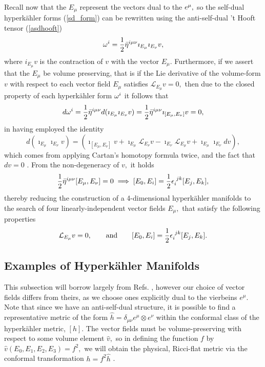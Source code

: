\documentclass[a4paper,12pt, onecolumn, notitlepage]{article}
\theoremstyle{definition}
\theoremstyle{remark}
\newcommand{\w}{\omega}
\newcommand{\m}{\mu}
\newcommand{\n}{\nu}
\newcommand{\e}{\epsilon}
\newcommand{\HK}{hyperk\"ahler }
\begin{document}
Recall now that the $E_{\m}$ represent the vectors dual to the $e\indices{^\m},$ so the self-dual \HK forms (\ref{sd_form}) can be rewritten using the anti-self-dual 't Hooft tensor (\ref{asdhooft}) \cite{ootsuka_1998}
\begin{equation*}
\w^{i} = \frac{1}{2}\bar{\eta}\indices{^i^\m^\n}\imath_{E_{\m}}\imath_{E_{\n}}v,
\end{equation*}
where $i_{E_{\m}}v$ is the contraction of $v$ with the vector $E_{\m}.$ Furthermore, if we assert that the $E_{\m}$ be volume preserving, that is if the Lie derivative of the volume-form $v$ with respect to each vector field $E_{\m}$ satisfies $\mathcal{L}_{E_{\m}}v = 0,$ then due to the closed property of each \HK form $\w\indices{^i}$ it follows that
\begin{align*}
	d\w^{i} = \frac{1}{2}\bar{\eta}\indices{^i^\m^\n}d(\imath_{E_{\m}}\imath_{E_{\n}}v) = \frac{1}{2}\bar{\eta}\indices{^i^\m^\n}\imath_{[E_{\m},E_{\n}]}v=0,
\end{align*}
in having employed the identity
\begin{equation*}
	\label{cartan}
	d(\imath_{E_{\m}}\imath_{E_{\n}}v)=(\imath_{[E_{\m},E_{\n}]}v + \imath_{E_{\m}}\mathcal{L}_{E_{\n}}v - \imath_{E_{\n}}\mathcal{L}_{E_{\m}}v + \imath_{E_{\m}}\imath_{E_{\n}}dv),
\end{equation*}
which comes from applying Cartan's homotopy formula twice, and the fact that $dv=0$ \cite{donaldson}. From the non-degeneracy of $v,$ it holds
\begin{equation}
	\label{half_flat}
	\frac{1}{2}\bar{\eta}\indices{^i^\m^\n}[E_{\m},E_{\n}] = 0 \implies [E_{0},E_{i}]=\frac{1}{2}\e\indices{_i^j^k}[E_{j},E_{k}],
\end{equation}
thereby reducing the construction of a 4-dimensional \HK manifolds to the search of four linearly-independent vector fields $E_{\m},$ that satisfy the following properties \cite{ootsuka_1998}
\begin{gather}
	\label{asj}
	\mathcal{L}_{E_{\m}}v = 0,\qquad \text{and}\qquad [E_{0},E_{i}]=\frac{1}{2}\e\indices{_i^j^k}[E_{j},E_{k}].
\end{gather}

\subsection{Examples of Hyperk\"ahler Manifolds}
This subsection will borrow largely from Refs. \cite{ootsuka_1998,joyce_1995}, however our choice of vector fields differs from theirs, as we choose ones explicitly dual to the vierbeins $e^{\m}$. Note that since we have an anti-self-dual structure, it is possible to find a representative metric of the form $\hat{h}=\delta_{\m\n}e^{\m}\otimes e^{\n}$ within the conformal class of the \HK metric, $[h]$. The vector fields must be volume-preserving with respect to some volume element $\hat{v},$ so in defining the function $f$ by $\hat{v}(E_{0},E_{1},E_{2},E_{3}) = f^{2},$ we will obtain the physical, Ricci-flat metric via the conformal transformation $h=f^{2}\hat{h}$ \cite{grant_1997}.\\
\end{document}
